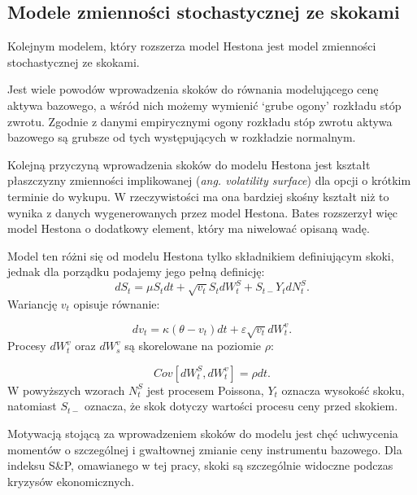 \documentclass{pracamgr}
\begin{document}
\subsection{Modele zmienności stochastycznej ze skokami} %
\label{sec:modele_zmienno_ci_stochastycznej_ze_skokami}
 
Kolejnym modelem, który rozszerza model Hestona jest model zmienności stochastycznej ze skokami.

Jest wiele powodów wprowadzenia skoków do równania modelującego cenę aktywa bazowego, a wśród nich 
możemy wymienić `grube ogony' rozkładu stóp zwrotu. Zgodnie z danymi empirycznymi ogony rozkładu stóp 
zwrotu aktywa bazowego są grubsze od tych występujących w rozkładzie normalnym.

Kolejną przyczyną wprowadzenia skoków do modelu Hestona jest kształt płaszczyzny zmienności implikowanej
(\textit{ang. volatility surface}) dla opcji o krótkim terminie do wykupu. W rzeczywistości ma ona 
bardziej skośny kształt niż to wynika z danych wygenerowanych przez model Hestona. 
Bates \cite{Bates} rozszerzył więc model Hestona o dodatkowy element, który ma niwelować opisaną wadę.

Model ten różni się od modelu Hestona tylko składnikiem definiującym skoki, jednak dla
porządku podajemy jego pełną definicję:
\begin{equation}
dS_t  = \mu S_t dt + \sqrt{v_t} S_t dW^S_t + S_{t-} Y_t dN_t^S.
\end{equation}
Wariancję $v_t$ opisuje równanie: 

\begin{equation}
dv_t  = \kappa (\theta - v_t)dt + \varepsilon \sqrt{v_t} dW_t^v.
\end{equation}
Procesy $dW_t^v$ oraz $dW_s^v$ są skorelowane na poziomie $\rho$:

\begin{equation}
Cov[dW^S_t, dW^v_t] = \rho dt.
\end{equation}
W powyższych wzorach $N_t^S$ jest procesem Poissona, $Y_t$ oznacza wysokość skoku, 
natomiast $S_{t-}$ oznacza, że skok dotyczy wartości procesu ceny przed skokiem.

Motywacją stojącą za wprowadzeniem skoków do modelu jest chęć uchwycenia momentów o 
szczególnej i gwałtownej zmianie ceny instrumentu bazowego. Dla indeksu S\&P, omawianego w tej pracy,
skoki są szczególnie widoczne podczas kryzysów ekonomicznych. 



 
\end{document}
